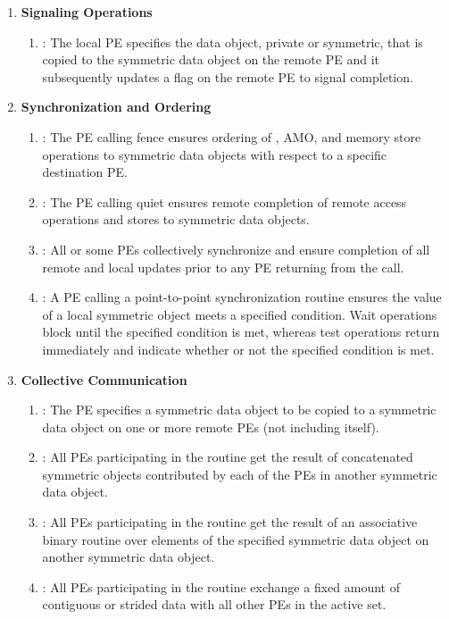 \begin{enumerate}
\item \textbf{Signaling Operations}
\begin{enumerate}
  \item {}: The local \ac{PE} specifies the \source{} data
        object, private or symmetric, that is copied to the symmetric data
        object on the remote \ac{PE} and it subsequently updates a flag
        on the remote \ac{PE} to signal completion.
\end{enumerate}

\item \textbf{Synchronization and Ordering}
\begin{enumerate}
  \item {}: The \ac{PE} calling fence ensures ordering of
  \PUT, \ac{AMO}, and memory store operations
  to symmetric data objects with respect to a specific
      destination \ac{PE}.
  \item {}: The \ac{PE} calling quiet ensures remote completion of remote access
      operations and stores to symmetric data objects.
  \item {}: All or some \acp{PE} collectively synchronize and ensure
      completion of all remote and local updates prior to any \ac{PE} returning
      from the call.
  \item {}: A \ac{PE} calling a point-to-point synchronization
      routine ensures the value of a local symmetric object meets a specified
      condition.  Wait operations block until the specified condition is
      met, whereas test operations return immediately and indicate whether or
      not the specified condition is met.
\end{enumerate}

\item \textbf{Collective Communication}
\begin{enumerate}
  \item {}: The  \ac{PE} specifies a symmetric data
      object to be copied to a symmetric data object on one or more remote
      \acp{PE} (not including itself).
  \item {}: All \acp{PE} participating in the routine get the result
      of concatenated symmetric objects contributed by each of the \acp{PE} in
      another symmetric data object.
  \item {}: All \acp{PE} participating in the routine get the result
      of an associative binary routine over elements of the specified symmetric
      data object on another symmetric data object.
  \item {}: All \acp{PE} participating in the routine exchange
      a fixed amount of contiguous or strided data with all other \acp{PE}
      in the active set.
\end{enumerate}


\end{enumerate}
